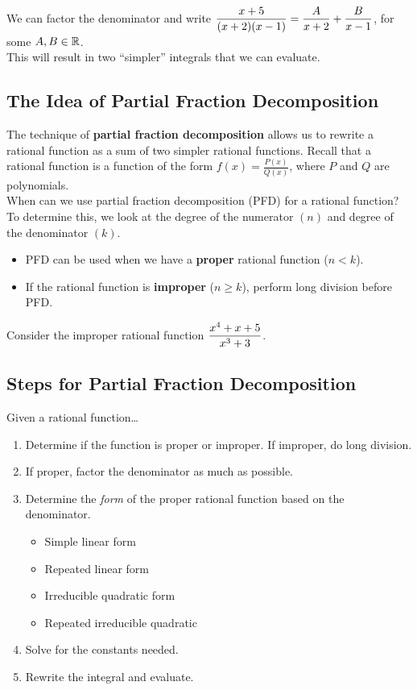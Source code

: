 \documentclass[12pt]{article}
\begin{document}
\vspace{4mm}

We can factor the denominator and write $\displaystyle\frac{x+5}{(x+2)(x-1)}=\frac{A}{x+2}+\frac{B}{x-1}$, for some $A,B\in\mathbb{R}$.\\

This will result in two ``simpler'' integrals that we can evaluate.

\newpage

\subsection*{The Idea of Partial Fraction Decomposition}

The technique of \textbf{partial fraction decomposition} allows us to rewrite a rational function as a sum of two simpler rational functions. Recall that a rational function is a function of the form $f(x)=\frac{P(x)}{Q(x)}$, where $P$ and $Q$ are polynomials.\\

When can we use partial fraction decomposition (PFD) for a rational function? To determine this, we look at the degree of the numerator $(n)$ and degree of the denominator $(k)$.
\begin{itemize}
	\item PFD can be used when we have a \textbf{proper} rational function ($n<k$).
	\item If the rational function is \textbf{improper} ($n\geq k$), perform long division before PFD.
	
\end{itemize}

\Example Consider the improper rational function $\displaystyle\frac{x^4+x+5}{x^3+3}$.

\vfill

\subsection*{Steps for Partial Fraction Decomposition}
Given a rational function\dots
\begin{enumerate}
	\item[\tc{1}] Determine if the function is proper or improper. If improper, do long division.
	\item[\tc{2}] If proper, factor the denominator as much as possible.
	\item[\tc{3}] Determine the \textit{form} of the proper rational function based on the denominator.
	\begin{itemize}
		\item Simple linear form
		\item Repeated linear form
		\item Irreducible quadratic form
		\item Repeated irreducible quadratic
	\end{itemize}
	\item[\tc{4}] Solve for the constants needed.
	\item[\tc{5}] Rewrite the integral and evaluate.
\end{enumerate}
\end{document}
